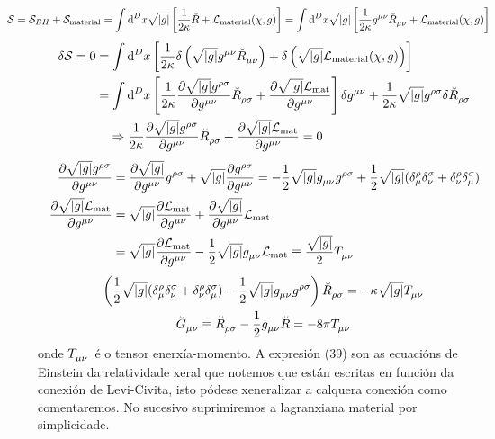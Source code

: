\begin{align}
    \hspace{-3em}\nonumber\mathcal{S}=\mathcal{S}_{EH} + \mathcal{S}_{\text{material}} = \int\dd^D x \sqrt{\abs g} \left[ \frac{1}{2\kappa}\breve R +\mathcal{L}_{\text{material}}(\chi, g)\right] = \int\dd^D x \sqrt{\abs g} \left[ \frac{1}{2\kappa}g\indices{^\mu^\nu}
    \breve R\indices{_\mu_\nu} +\mathcal{L}_{\text{material}}(\chi, g)\right]
\end{align}
\begin{align*}
    \delta\mathcal{S} = 0 &= \int\dd^D x  \left[ \frac{1}{2\kappa}\delta\left(\sqrt{\abs g}g\indices{^\mu^\nu}
    \breve R\indices{_\mu_\nu}\right) + \delta\left(\sqrt{\abs g}\mathcal{L}_{\text{material}}(\chi, g)\right)\right]\\
    &= \int\dd^D x \left[ \frac{1}{2\kappa}\diffp{\sqrt{\abs g}g\indices{^\rho^\sigma}}{g\indices{^\mu^\nu}}\breve R\indices{_\rho_\sigma} + \diffp{\sqrt{\abs g}\mathcal{L}_{\text{mat}}}{g\indices{^\mu^\nu}}
    \right]\delta g\indices{^\mu^\nu} +\frac{1}{2\kappa}
    \sqrt{\abs g}g\indices{^\rho^\sigma}\delta\breve R\indices{_\rho_\sigma}\\
    &\hspace{1em}\Rightarrow \frac{1}{2\kappa}\diffp{\sqrt{\abs g}g\indices{^\rho^\sigma}}{g\indices{^\mu^\nu}}\breve R\indices{_\rho_\sigma} + \diffp{\sqrt{\abs g}\mathcal{L}_{\text{mat}}}{g\indices{^\mu^\nu}} = 0
\end{align*}
\begin{align*}
    \diffp{\sqrt{\abs g}g\indices{^\rho^\sigma}}{g\indices{^\mu^\nu}} &= \diffp{\sqrt{\abs g}}{g\indices{^\mu^\nu}}g\indices{^\rho^\sigma} + \sqrt{\abs g}\diffp{g\indices{^\rho^\sigma}}{g\indices{^\mu^\nu}} =  -\frac{1}{2}\sqrt{\abs g}g\indices{_\mu_\nu}g\indices{^\rho^\sigma} + \frac{1}{2}\sqrt{\abs g}(\delta^\rho_\mu\delta^\sigma_\nu + \delta^\rho_\nu\delta^\sigma_\mu)\\
    \diffp{\sqrt{\abs g}\mathcal{L}_{\text{mat}}}{g\indices{^\mu^\nu}} &=
    \sqrt{\abs g}\diffp{\mathcal{L}_{\text{mat}}}{g\indices{^\mu^\nu}} +  \diffp{\sqrt{\abs g}}{g\indices{^\mu^\nu}}\mathcal{L}_{\text{mat}}\\
    &= \sqrt{\abs g}\diffp{\mathcal{L}_{\text{mat}}}{g\indices{^\mu^\nu}} -\frac{1}{2}\sqrt{\abs g}{g\indices{_\mu_\nu}}\mathcal{L}_{\text{mat}} \equiv \frac{\sqrt{\abs g}}2 T\indices{_\mu_\nu}
\end{align*}
\begin{gather}
    \nonumber\left(\frac{1}{2}\sqrt{\abs g}(\delta^\rho_\mu\delta^\sigma_\nu + \delta^\rho_\nu\delta^\sigma_\mu) -\frac{1}{2}\sqrt{\abs g}g\indices{_\mu_\nu}g\indices{^\rho^\sigma}\right)\breve R\indices{_\rho_\sigma} =
    -\kappa\sqrt{\abs g} T\indices{_\mu_\nu}\\
    \breve G\indices{_\mu_\nu}\equiv\breve R\indices{_\rho_\sigma} -\frac{1}{2}g\indices{_\mu_\nu}\breve R = -8\pi T\indices{_\mu_\nu}
\end{gather}
onde $T\indices{_\mu_\nu}$ é o tensor enerxía-momento. A expresión (39) son as ecuacións de Einstein da relatividade xeral que notemos que están escritas en función da conexión de Levi-Civita, isto pódese xeneralizar a calquera conexión como comentaremos. No sucesivo suprimiremos a lagranxiana material por simplicidade.

